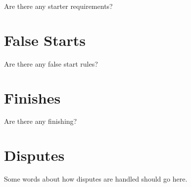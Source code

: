 \begin{framed}
Are there any starter requirements?
\end{framed}

\section{False Starts}

\begin{framed}
Are there any false start rules?
\end{framed}

\section{Finishes}

\begin{framed}
Are there any finishing?
\end{framed}

\section{Disputes}

\begin{framed}
Some words about how disputes are handled should go here.
\end{framed}
